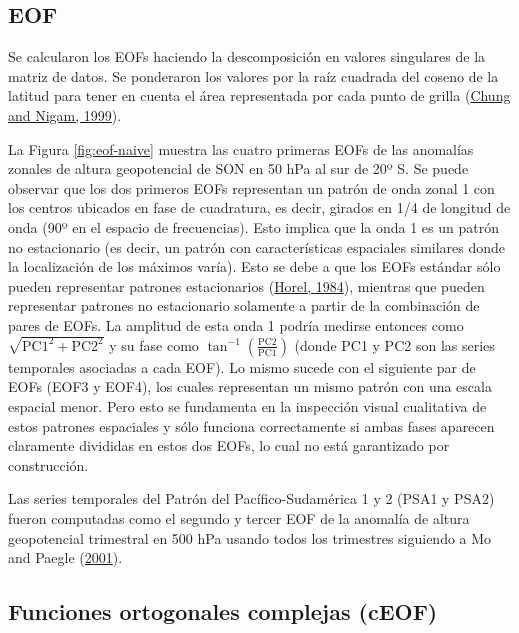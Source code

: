 \documentclass[12pt,oneside,a4paper]{reedthesis}
\begin{document}
\hypertarget{eof}{%
\subsection{EOF}\label{eof}}

Se calcularon los EOFs haciendo la descomposición en valores singulares de la matriz de datos.
Se ponderaron los valores por la raíz cuadrada del coseno de la latitud para tener en cuenta el área representada por cada punto de grilla (\protect\hyperlink{ref-chung1999}{Chung and Nigam, 1999}).

La Figura \ref{fig:eof-naive} muestra las cuatro primeras EOFs de las anomalías zonales de altura geopotencial de SON en 50 hPa al sur de 20º S.
Se puede observar que los dos primeros EOFs representan un patrón de onda zonal 1 con los centros ubicados en fase de cuadratura, es decir, girados en 1/4 de longitud de onda (90º en el espacio de frecuencias).
Esto implica que la onda 1 es un patrón no estacionario (es decir, un patrón con características espaciales similares donde la localización de los máximos varía).
Esto se debe a que los EOFs estándar sólo pueden representar patrones estacionarios (\protect\hyperlink{ref-horel1984}{Horel, 1984}), mientras que pueden representar patrones no estacionario solamente a partir de la combinación de pares de EOFs.
La amplitud de esta onda 1 podría medirse entonces como \(\sqrt{\mathrm{PC1}^2 + \mathrm{PC2}^2}\) y su fase como \(\tan^{-1} \left ( \frac{\mathrm{PC2}}{\mathrm{PC1}} \right )\) (donde PC1 y PC2 son las series temporales asociadas a cada EOF).
Lo mismo sucede con el siguiente par de EOFs (EOF3 y EOF4), los cuales representan un mismo patrón con una escala espacial menor.
Pero esto se fundamenta en la inspección visual cualitativa de estos patrones espaciales y sólo funciona correctamente si ambas fases aparecen claramente divididas en estos dos EOFs, lo cual no está garantizado por construcción.

Las series temporales del Patrón del Pacífico-Sudamérica 1 y 2 (PSA1 y PSA2) fueron computadas como el segundo y tercer EOF de la anomalía de altura geopotencial trimestral en 500 hPa usando todos los trimestres siguiendo a Mo and Paegle (\protect\hyperlink{ref-mo2001}{2001}).

\hypertarget{ceof-metodo}{%
\subsection{Funciones ortogonales complejas (cEOF)}\label{ceof-metodo}}
\end{document}
